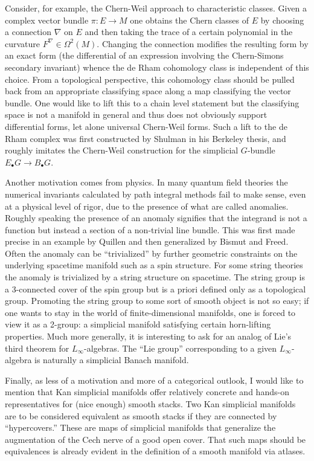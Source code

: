 \documentclass{amsart}
\begin{document}
Consider, for example, the Chern-Weil approach to characteristic classes. Given 
a complex vector bundle $\pi: E\to M$ one obtains the Chern classes of $E$ by 
choosing a connection $\nabla$ on $E$ and then taking the trace of a certain 
polynomial in the curvature $F^\nabla\in\Omega^2(M)$. Changing the connection 
modifies the resulting form by an exact form (the differential of an expression 
involving the Chern-Simons secondary invariant) whence the de Rham cohomology 
class is independent of this choice. From a topological perspective, this 
cohomology class should be pulled back from an appropriate classifying space 
along a map classifying the vector bundle. One would like to lift this to
a chain level statement but the classifying space is not a manifold in general
and thus does not obviously support differential forms, let alone universal 
Chern-Weil forms. Such a lift to the de Rham complex was first constructed by 
Shulman in his Berkeley thesis, and roughly imitates the Chern-Weil construction 
for the simplicial $G$-bundle $E_\bullet G\to B_\bullet G$.

Another motivation comes from physics. In many quantum field theories the 
numerical invariants calculated by path integral methods fail to make sense, 
even at a physical level of rigor, due to the presence of what are called 
anomalies. Roughly speaking the presence of an anomaly signifies that the 
integrand is not a function but instead a section of a non-trivial line bundle. 
This was first made precise in an example by Quillen and then generalized by
Bismut and Freed. Often the anomaly can be ``trivialized'' by further geometric 
constraints on the underlying spacetime manifold such as a spin structure.
For some string theories the anomaly is trivialized by a string structure on 
spacetime. The string group is a 3-connected cover of the spin group
but is a priori defined only as a topological group. Promoting the string 
group to some sort of smooth object is not so easy; if one wants to stay in the 
world of finite-dimensional manifolds, one is forced to view it as a 2-group: a 
simplicial manifold satisfying certain horn-lifting properties. Much more 
generally, it is interesting to ask for an analog of Lie's third theorem for 
$L_\infty$-algebras. The ``Lie group'' corresponding to a given 
$L_\infty$-algebra is naturally a simplicial Banach manifold.

Finally, as less of a motivation and more of a categorical outlook, I would like 
to mention that Kan simplicial manifolds offer relatively concrete and hands-on
representatives for (nice enough) smooth stacks. Two Kan simplicial 
manifolds are to be considered equivalent as smooth stacks if they are connected 
by ``hypercovers.'' These are maps of simplicial manifolds that generalize the 
augmentation of the Cech nerve of a good open cover. That such maps should be 
equivalences is already evident in the definition of a smooth manifold via 
atlases.
\end{document}
